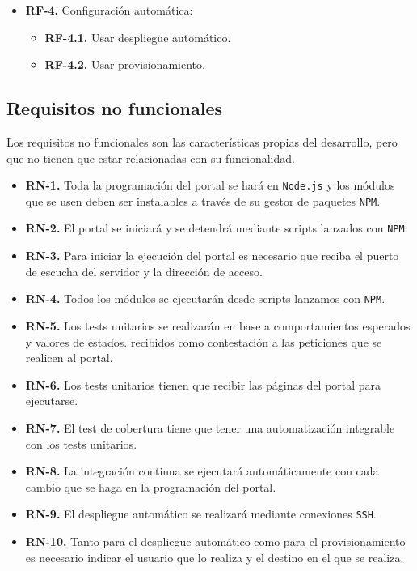 \begin{itemize}
  \item \textbf{RF-4.} Configuración automática:
  \begin{itemize}
    \item \textbf{RF-4.1.} Usar despliegue automático.
    \item \textbf{RF-4.2.} Usar provisionamiento.
    \end{itemize}
\end{itemize}

\subsection{Requisitos no funcionales}

Los requisitos no funcionales son las características propias del desarrollo, pero que no tienen que estar relacionadas con su funcionalidad.

\begin{itemize}
  \item \textbf{RN-1.} Toda la programación del portal se hará en {\tt Node.js} y los módulos que se usen deben ser instalables a través de su gestor de paquetes {\tt NPM}.
  \item \textbf{RN-2.} El portal se iniciará y se detendrá mediante scripts lanzados con {\tt NPM}.
  \item \textbf{RN-3.} Para iniciar la ejecución del portal es necesario que reciba el puerto de escucha del servidor y la dirección de acceso.
  \item \textbf{RN-4.} Todos los módulos se ejecutarán desde scripts lanzamos con {\tt NPM}.
  \item \textbf{RN-5.} Los tests unitarios se realizarán en base a comportamientos esperados y valores de estados.
  recibidos como contestación a las peticiones que se realicen al portal.
  \item \textbf{RN-6.} Los tests unitarios tienen que recibir las páginas del portal para ejecutarse.
  \item \textbf{RN-7.} El test de cobertura tiene que tener una automatización integrable con los tests unitarios. 
  \item \textbf{RN-8.} La integración continua se ejecutará automáticamente con cada cambio que se haga en la programación del portal.
  \item \textbf{RN-9.} El despliegue automático se realizará mediante conexiones {\tt SSH}.
  \item \textbf{RN-10.} Tanto para el despliegue automático como para el provisionamiento es necesario indicar el usuario que lo realiza y el destino en el que se realiza.
\end{itemize}

